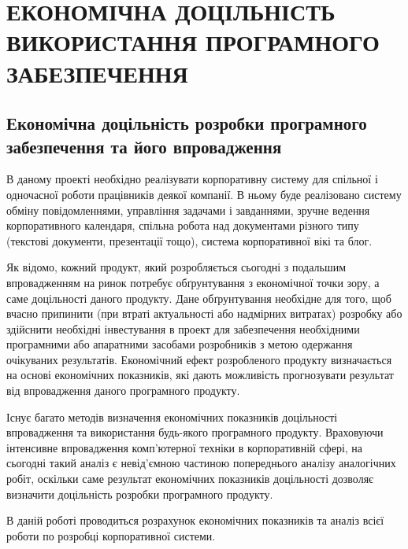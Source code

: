 \section{ЕКОНОМІЧНА ДОЦІЛЬНІСТЬ ВИКОРИСТАННЯ ПРОГРАМНОГО ЗАБЕЗПЕЧЕННЯ}

\subsection{Економічна доцільність розробки програмного забезпечення та його впровадження}

В даному проекті необхідно реалізувати корпоративну систему для спільної і одночасної роботи працівників деякої компанії. В ньому буде реалізовано систему обміну повідомленнями, управління задачами і завданнями, зручне ведення корпоративного календаря, спільна робота над документами різного типу (текстові документи, презентації тощо), система корпоративної вікі та блог. 
\par Як відомо, кожний продукт, який розробляється сьогодні з подальшим впровадженням на ринок потребує обґрунтування з економічної точки зору, а саме доцільності даного продукту. Дане обґрунтування необхідне для того, щоб вчасно припинити (при втраті актуальності або надмірних витратах) розробку або здійснити необхідні інвестування в проект для забезпечення необхідними програмними або апаратними засобами розробників з метою одержання очікуваних результатів. Економічний ефект розробленого продукту визначається на основі економічних показників, які дають можливість прогнозувати результат від впровадження даного програмного продукту.
\par Існує багато методів визначення економічних показників доцільності впровадження та використання будь-якого програмного продукту. Враховуючи інтенсивне впровадження комп’ютерної техніки в корпоративній сфері, на сьогодні такий аналіз є невід’ємною частиною попереднього аналізу аналогічних робіт, оскільки саме результат економічних показників доцільності дозволяє визначити доцільність розробки програмного продукту.
\par В даній роботі проводиться розрахунок економічних показників та аналіз всієї роботи по розробці корпоративної системи.

